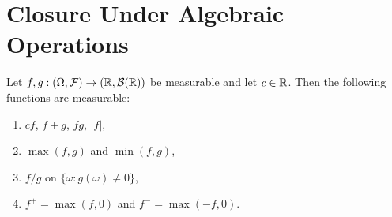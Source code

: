 \documentclass[11pt,a4paper]{article}
\begin{document}

\section{Closure Under Algebraic Operations}
\label{sec:algebraic_closure}

\begin{theorem}
\label{thm:meas_closure}
Let $f, g: (\Omega, \mathcal{F}) \to (\mathbb{R}, \mathcal{B}(\mathbb{R}))$ be measurable
and let $c \in \mathbb{R}$. Then the following functions are measurable:
\begin{enumerate}[nosep,label=(\alph*)]
  \item $cf$, \quad $f + g$, \quad $fg$, \quad $|f|$,
  \item $\max(f, g)$ \quad and \quad $\min(f, g)$,
  \item $f/g$ on $\{\omega : g(\omega) \neq 0\}$,
  \item $f^+ = \max(f, 0)$ \quad and \quad $f^- = \max(-f, 0)$.
\end{enumerate}
\end{theorem}
\end{document}
